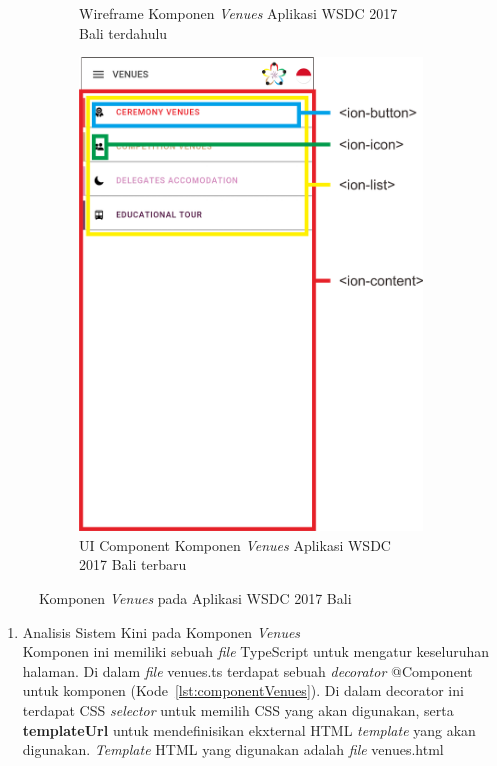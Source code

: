 \begin{enumerate}
\begin{figure}[H]
\begin{subfigure}[b]{0.435\textwidth}
         	\caption{Wireframe Komponen \textit{Venues} Aplikasi WSDC 2017 Bali terdahulu}
         	\label{fig:VenuePageWireframe}
     	\end{subfigure}
     	\hspace*{0.5in}
     	\begin{subfigure}[b]{0.43\textwidth}
         	\centering
         	\includegraphics[scale=0.4]{Gambar/VenuePageKini.png}
         	\caption{UI Component Komponen \textit{Venues} Aplikasi WSDC 2017 Bali terbaru}
         	\label{fig:VenuePageKini}
     	\end{subfigure}
        \caption{Komponen \textit{Venues} pada Aplikasi WSDC 2017 Bali}
        \label{fig:UIComponent1}
	\end{figure}
	\begin{enumerate}
		\item Analisis Sistem Kini pada Komponen \textit{Venues} \\
		Komponen ini memiliki sebuah \textit{file} TypeScript untuk mengatur keseluruhan halaman. Di dalam \textit{file} venues.ts terdapat sebuah \textit{decorator} @Component untuk komponen (Kode~\ref{lst:componentVenues}). Di dalam decorator ini terdapat CSS \textit{selector} untuk memilih CSS yang akan digunakan, serta \textbf{templateUrl} untuk mendefinisikan ekxternal HTML \textit{template} yang akan digunakan. \textit{Template} HTML yang digunakan adalah \textit{file} venues.html
	

\end{enumerate}
\end{enumerate}
